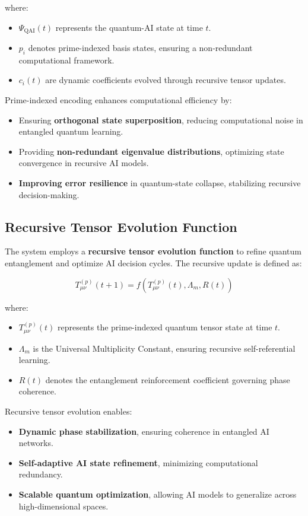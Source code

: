 \documentclass{article}
\theoremstyle{plain}
\begin{document}
where:
\begin{itemize}
    \item \( \Psi_{\text{QAI}}(t) \) represents the quantum-AI state at time \( t \).
    \item \( p_i \) denotes prime-indexed basis states, ensuring a non-redundant computational framework.
    \item \( c_{i}(t) \) are dynamic coefficients evolved through recursive tensor updates.
\end{itemize}

Prime-indexed encoding enhances computational efficiency by:
\begin{itemize}
    \item Ensuring \textbf{orthogonal state superposition}, reducing computational noise in entangled quantum learning.
    \item Providing \textbf{non-redundant eigenvalue distributions}, optimizing state convergence in recursive AI models.
    \item \textbf{Improving error resilience} in quantum-state collapse, stabilizing recursive decision-making.
\end{itemize}

\subsection{Recursive Tensor Evolution Function}

The system employs a \textbf{recursive tensor evolution function} to refine quantum entanglement and optimize AI decision cycles. The recursive update is defined as:

\begin{equation}
    T_{\mu \nu}^{(p)}(t+1) = f(T_{\mu \nu}^{(p)}(t), \Lambda_m, R(t))
\end{equation}

where:
\begin{itemize}
    \item \( T_{\mu \nu}^{(p)}(t) \) represents the prime-indexed quantum tensor state at time \( t \).
    \item \( \Lambda_m \) is the Universal Multiplicity Constant, ensuring recursive self-referential learning.
    \item \( R(t) \) denotes the entanglement reinforcement coefficient governing phase coherence.
\end{itemize}

Recursive tensor evolution enables:
\begin{itemize}
    \item \textbf{Dynamic phase stabilization}, ensuring coherence in entangled AI networks.
    \item \textbf{Self-adaptive AI state refinement}, minimizing computational redundancy.
    \item \textbf{Scalable quantum optimization}, allowing AI models to generalize across high-dimensional spaces.
\end{itemize}
\end{document}
